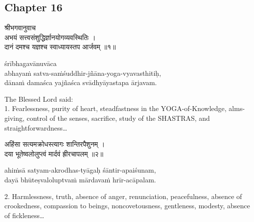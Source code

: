 \chapterdrop

\begin{center}

\headerspace
{}

\section{Chapter 16}

\headerspace
{}

\headerspace
{}

\headerspace
{}

\headerspace
\end{center}

\begin{gitaverse}
श्रीभगवानुवाच \\
अभयं सत्त्वसंशुद्धिर्ज्ञानयोगव्यवस्थितिः । \\
दानं दमश्च यज्ञश्च स्वाध्यायस्तप आर्जवम् ॥१॥
\end{gitaverse}

\begin{transliteration}
śrībhagavānuvāca \\
abhayaṁ satva-saṁśuddhir-jñāna-yoga-vyavasthitiḥ, \\
dānaṁ damaśca yajñaśca svādhyāyastapa ārjavam.
\end{transliteration}

The Blessed Lord said: \\
1. Fearlessness, purity of heart, steadfastness in the YOGA-of-Knowledge,
alms-giving, control of the senses, sacrifice, study of the SHASTRAS, and
straightforwardness\ldots

\begin{gitaverse}
अहिंसा सत्यमक्रोधस्त्यागः शान्तिरपैशुनम् । \\
दया भूतेष्वलोलुप्त्वं मार्दवं ह्रीरचापलम् ॥२॥
\end{gitaverse}

\begin{transliteration}
ahiṁsā satyam-akrodhas-tyāgaḥ śāntir-apaiśunam, \\
dayā bhūteṣvaloluptvaṁ mārdavaṁ hrīr-acāpalam.
\end{transliteration}

2. Harmlessness, truth, absence of anger, renunciation, peacefulness, absence
of crookedness, compassion to beings, noncovetousness, gentleness, modesty,
absence of fickleness\ldots

